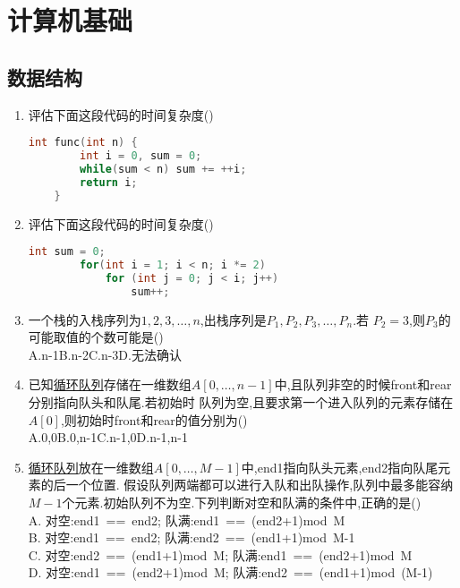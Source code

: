 \documentclass[12pt, a4paper, oneside, UTF8]{ctexbook}
\begin{document}
% 
\else
\fi
\chapter{计算机基础}
\section{数据结构}
\begin{enumerate}
    \item  评估下面这段代码的时间复杂度()
\begin{lstlisting}[language=C]
    int func(int n) {
        int i = 0, sum = 0;
        while(sum < n) sum += ++i;
        return i;
    }
\end{lstlisting}
    \begin{solution}
        
    \end{solution}

    \item 评估下面这段代码的时间复杂度()
\begin{lstlisting}[language=C]
    int sum = 0;
        for(int i = 1; i < n; i *= 2)
            for (int j = 0; j < i; j++)
                sum++;
\end{lstlisting}

    \begin{solution}
        
    \end{solution}

    \item 一个栈的入栈序列为\underline{$1,2,3,\ldots,n$},出栈序列是\underline{$P_1,P_2,P_3,\ldots,P_n$}.若
    $P_2=3$,则$P_3$的可能取值的个数可能是() \\
    A.n-1\qquad B.n-2\qquad C.n-3\qquad D.无法确认 

    \item 已知\underline{循环队列}存储在一维数组$A[0,\ldots,n-1]$中,且队列非空的时候front和rear分别指向队头和队尾.若初始时
    队列为空,且要求第一个进入队列的元素存储在$A[0]$,则初始时front和rear的值分别为() \\
    A.0,0\qquad\qquad B.0,n-1\qquad\qquad C.n-1,0\qquad\qquad D.n-1,n-1

    \item \underline{循环队列}放在一维数组$A[0,\ldots,M-1]$中,end1指向队头元素,end2指向队尾元素的后一个位置.
    假设队列两端都可以进行入队和出队操作,队列中最多能容纳$M-1$个元素.初始队列不为空.下列判断对空和队满的条件中,正确的是() \\
    A. 对空:end1\ ==\ end2; \qquad\qquad\qquad\qquad\quad 队满:end1\ ==\ (end2+1)mod\ M\\
    B. 对空:end1\ ==\ end2; \qquad\qquad\qquad\qquad\quad 队满:end2\ ==\ (end1+1)mod\ M-1\\
    C. 对空:end2\ ==\ (end1+1)mod\ M; \qquad\qquad 队满:end1\ ==\ (end2+1)mod\ M\\
    D. 对空:end1\ ==\ (end2+1)mod\ M; \qquad\qquad 队满:end2\ ==\ (end1+1)mod\ (M-1)
    

\end{enumerate}
\end{document}

